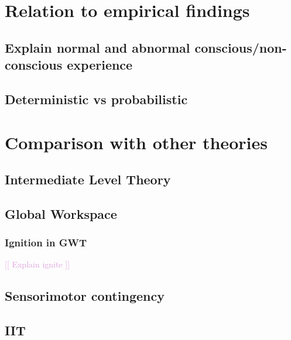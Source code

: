 \documentclass[utf8]{frontiersSCNS}
\newcommand{\temp}[1]{\textcolor{Plum}{[[ #1 ]]\newline}}
\begin{document}
	\cite{sederberg2018learning}


\section{Relation to empirical findings}
	\subsection{Explain normal and abnormal conscious/non-conscious experience}
	




	\subsection{Deterministic vs probabilistic}
	\cite{dehaene2017consciousness}
	\cite{vul2008temporal, moreno2011bayesian, asplund2014attentional, vul2009attention}
	
\section{Comparison with other theories}
	\subsection{Intermediate Level Theory}
	\subsection{Global Workspace}
	

	\subsubsection{Ignition in GWT}
 	\temp{Explain ignite}
	
	
	\subsection{Sensorimotor contingency}
	\subsection{IIT}
\end{document}
